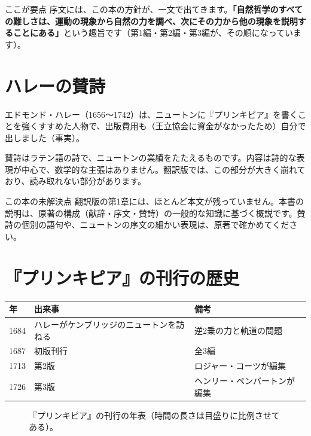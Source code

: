 \documentclass[a4paper,11pt,openany]{ltjsbook}
\begin{document}
\begin{pointbox}{ここが要点}
序文には、この本の方針が、一文で出てきます。\textbf{「自然哲学のすべての難しさは、運動の現象から自然の力を調べ、次にその力から他の現象を説明することにある」}という趣旨です（第1編・第2編・第3編が、その順になっています）。
\end{pointbox}

\section{ハレーの賛詩}

エドモンド・ハレー（1656〜1742）は、ニュートンに『プリンキピア』を書くことを強くすすめた人物で、出版費用も（王立協会に資金がなかったため）自分で出しました（事実）。

賛詩はラテン語の詩で、ニュートンの業績をたたえるものです。内容は詩的な表現が中心で、数学的な主張はありません。翻訳版では、この部分が大きく崩れており、読み取れない部分があります。

\begin{notebox}{この本の未解決点}
翻訳版の第1章には、ほとんど本文が残っていません。本書の説明は、原著の構成（献辞・序文・賛詩）の一般的な知識に基づく概説です。賛詩の個別の語句や、ニュートンの序文の細かい表現は、原著で確かめてください。
\end{notebox}

\section{『プリンキピア』の刊行の歴史}

\begin{center}
\begin{tabular}{lll}
\toprule
年 & 出来事 & 備考\\
\midrule
1684 & ハレーがケンブリッジのニュートンを訪ねる & 逆2乗の力と軌道の問題\\
1687 & 初版刊行 & 全3編\\
1713 & 第2版 & ロジャー・コーツが編集\\
1726 & 第3版 & ヘンリー・ペンバートンが編集\\
\bottomrule
\end{tabular}
\end{center}

\begin{figure}[htbp]
\centering
{}
\caption{『プリンキピア』の刊行の年表（時間の長さは目盛りに比例させてある）。}
\end{figure}
\end{document}
